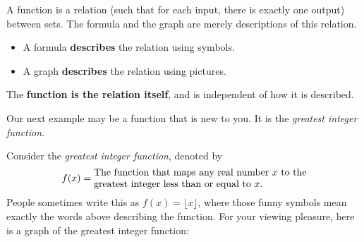 \documentclass{ximera}
\begin{document}
\begin{warning}
A function is a relation (such that for each input, there is exactly
one output) between sets. The formula and the graph are merely
descriptions of this relation.
\begin{itemize}
\item A formula \textbf{describes} the relation using symbols.
\item A graph \textbf{describes} the relation using pictures. 
\end{itemize}
The \textbf{function is the relation itself}, and is independent of how
it is described.
\end{warning}

Our next example may be a function that is new to you. It is the
\textit{greatest integer function}.

\begin{example}
Consider the \textit{greatest integer function}, denoted by
\[
f(x) = \begin{minipage}{3in}The function that maps any real number $x$
  to the greatest integer less than or equal to $x$.\end{minipage}
\]
People sometimes write this as $f(x) = \lfloor x\rfloor$, where those
funny symbols mean exactly the words above describing the
function. For your viewing pleasure, here is a graph of the greatest
integer function:


\end{example}
\end{document}
